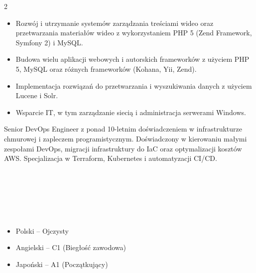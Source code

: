 \documentclass[10pt,a4paper,ragged2e,withhyper]{altacv}
\begin{document}
\begin{paracol}{2}
\divider

\begin{itemize}
\item Rozwój i utrzymanie systemów zarządzania treściami wideo oraz przetwarzania materiałów wideo z wykorzystaniem PHP 5 (Zend Framework, Symfony 2) i MySQL.
\end{itemize}

\divider

\begin{itemize}
\item Budowa wielu aplikacji webowych i autorskich frameworków z użyciem PHP 5, MySQL oraz różnych frameworków (Kohana, Yii, Zend).
\item Implementacja rozwiązań do przetwarzania i wyszukiwania danych z użyciem Lucene i Solr.
\item Wsparcie IT, w tym zarządzanie siecią i administracja serwerami Windows.
\end{itemize}


\switchcolumn

Senior DevOps Engineer z ponad 10-letnim doświadczeniem w infrastrukturze chmurowej i zapleczem programistycznym. Doświadczony w kierowaniu małymi zespołami DevOps, migracji infrastruktury do IaC oraz optymalizacji kosztów AWS. Specjalizacja w Terraform, Kubernetes i automatyzacji CI/CD.


\\
\\
\\
\\
\\

\begin{itemize}
\item Polski -- Ojczysty
\item Angielski -- C1 (Biegłość zawodowa)
\item Japoński -- A1 (Początkujący)
\end{itemize}


\end{paracol}
\end{document}
